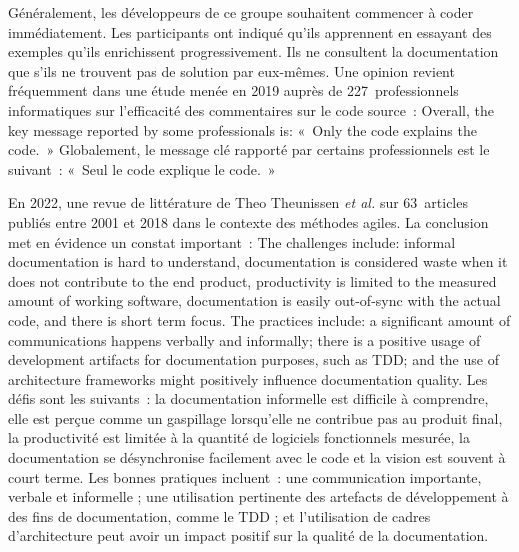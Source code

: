 {{\elide Généralement, les développeurs de ce groupe souhaitent commencer à coder immédiatement. Les participants ont indiqué qu'ils apprennent en essayant des exemples qu'ils enrichissent progressivement. Ils ne consultent la documentation que s'ils ne trouvent pas de solution par eux-mêmes.}
{\cite{meng_application_2018}}
Une opinion revient fréquemment dans une étude menée en 2019 auprès de 227~professionnels informatiques sur l'efficacité des commentaires sur le code source~:
\quoteenfr
{Overall, the key message reported by some professionals is: «~Only the code explains the code.~»}
{Globalement, le message clé rapporté par certains professionnels est le suivant~: «~Seul le code explique le code.~»}
{\cite{nielebock_commenting_2019}}

En 2022, une revue de littérature de Theo Theunissen \textit{et al.} sur 63~articles publiés entre  2001 et 2018 dans le contexte des méthodes agiles. La conclusion met en évidence un constat important~:
\quoteenfr
{The challenges include: informal documentation is hard to understand, documentation is considered waste when it does not contribute to the end product, productivity is limited to the measured amount of working software, documentation is easily out-of-sync with the actual code, and there is short term focus. The practices include: a significant amount of communications happens verbally and informally; there is a positive usage of development artifacts for documentation purposes, such as TDD; and the use of architecture frameworks might positively influence documentation quality.}
{Les défis sont les suivants~: la documentation informelle est difficile à comprendre, elle est perçue comme un gaspillage lorsqu’elle ne contribue pas au produit final, la productivité est limitée à la quantité de logiciels fonctionnels mesurée, la documentation se désynchronise facilement avec le code et la vision est souvent à court terme. Les bonnes pratiques incluent~: une communication importante, verbale et informelle ; une utilisation pertinente des artefacts de développement à des fins de documentation, comme le TDD ; et l’utilisation de cadres d’architecture peut avoir un impact positif sur la qualité de la documentation.}
{\cite{theunissen_mapping_2022}}
\vspace{-1\baselineskip}
}{}

